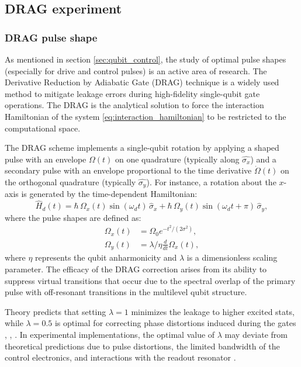 \subsection{DRAG experiment}\label{sec:DRAG}
\subsubsection{DRAG pulse shape}
As mentioned in section \ref{sec:qubit_control}, the study of optimal pulse shapes (especially for drive and control pulses) is an active area of research. 
The Derivative Reduction by Adiabatic Gate (DRAG) technique \cite{Motzoi_2009}\cite{Gambetta_2011} is a widely used method to mitigate leakage errors during high-fidelity single-qubit gate operations.
The DRAG is the analytical solution to force the interaction Hamiltonian of the system \ref{eq:interaction_hamiltonian} to be restricted to the computational space.

The DRAG scheme implements a single-qubit rotation by applying a shaped pulse with an envelope $\Omega(t)$ on one quadrature (typically along $\hat{\sigma_x}$) and a secondary pulse with an envelope proportional to the time derivative $\dot{\Omega}(t)$ on the orthogonal quadrature (typically $\hat{\sigma_y}$).
For instance, a rotation about the $x$-axis is generated by the time-dependent Hamiltonian\cite{manenti_quantum_2023}:
\begin{equation}\label{eq:DRAG_hamiiltonian}
    \hat{H}_d(t) = \hbar \, \Omega_x(t) \sin(\omega_d t) \, \hat{\sigma}_x + \hbar \, \Omega_y(t) \sin(\omega_d t + \pi) \, \hat{\sigma}_y,
\end{equation}
where the pulse shapes are defined as:
\begin{align}
    \Omega_x(t) &= \Omega_0 e^{-t^2 / (2\sigma^2)}, \\
    \Omega_y(t) &= \lambda/\eta \frac{d}{dt} \Omega_x(t),
\end{align}
where $\eta$ represents the qubit anharmonicity and $\lambda$ is a dimensionless scaling parameter.
The efficacy of the DRAG correction arises from its ability to suppress virtual transitions that occur due to the spectral overlap of the primary pulse with off-resonant transitions in the multilevel qubit structure.

Theory predicts that setting $\lambda=1$ minimizes the leakage to higher excited stats, while $\lambda=0.5$ is optimal for correcting phase distortions induced during the gates \cite{Motzoi_2009}, \cite{Gambetta_2011}, \cite{Motzoi2013}.
In experimental implementations, the optimal value of $\lambda$ may deviate from theoretical predictions due to pulse distortions, the limited bandwidth of the control electronics, and interactions with the readout resonator \cite{PhysRevA.82.040305}.

